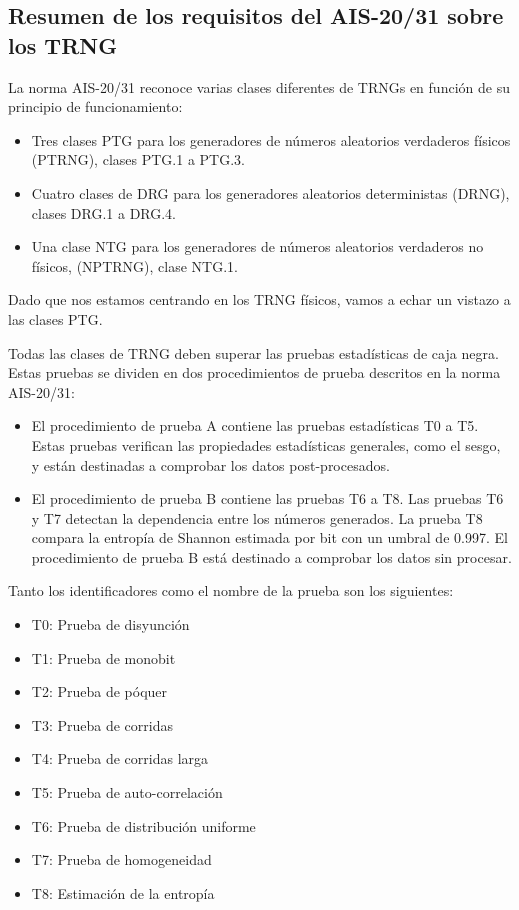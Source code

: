 		\subsection{Resumen de los requisitos del AIS-20/31 sobre los TRNG}
	
	La norma AIS-20/31 reconoce varias clases diferentes de TRNGs en función de su principio de funcionamiento:
	
	\begin{itemize}[noitemsep]
		\item Tres clases PTG para los generadores de números aleatorios verdaderos físicos (PTRNG), clases PTG.1 a PTG.3.
		\item Cuatro clases de DRG para los generadores aleatorios deterministas (DRNG), clases DRG.1 a DRG.4.
		\item Una clase NTG para los generadores de números aleatorios verdaderos no físicos, (NPTRNG), clase NTG.1.
	\end{itemize}
	
	Dado que nos estamos centrando en los TRNG físicos, vamos a echar un vistazo a las clases PTG.
	
	Todas las clases de TRNG deben superar las pruebas estadísticas de caja negra. Estas pruebas se dividen en dos procedimientos de prueba descritos en la norma AIS-20/31:
	
	\begin{itemize}[noitemsep]
		\item El procedimiento de prueba A contiene las pruebas estadísticas T0 a T5. Estas pruebas verifican las propiedades estadísticas generales, como el sesgo, y están destinadas a comprobar los datos post-procesados.
		
		\item El procedimiento de prueba B contiene las pruebas T6 a T8. Las pruebas T6 y T7 detectan la dependencia entre los números generados. La prueba T8 compara la entropía de Shannon estimada por bit con un umbral de 0.997. El procedimiento de prueba B está destinado a comprobar los datos sin procesar.
	\end{itemize}		
	Tanto los identificadores como el nombre de la prueba son los siguientes:
	\begin{itemize}[noitemsep]
		\item T0: Prueba de disyunción
		\item T1: Prueba de monobit 
		\item T2: Prueba de póquer
		\item T3: Prueba de corridas
		\item T4: Prueba de corridas larga
		\item T5: Prueba de auto-correlación
		\item T6: Prueba de distribución uniforme
		\item T7: Prueba de homogeneidad
		\item T8: Estimación de la entropía
	\end{itemize}
	
